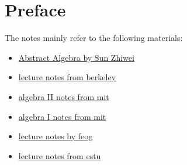 \chapter*{Preface}

The notes mainly refer to the following materials:
\begin{itemize}
    \item \href{https://www.bilibili.com/video/BV1AL4y1h7iF?p=1&vd_source=3d4b12fb4a4bfbc98942d43612ae2fb9}{Abstract Algebra by Sun Zhiwei}
    \item \href{https://math.berkeley.edu/~mcivor/math113su16/}{lecture notes from berkeley}
    \item \href{https://ocw.mit.edu/courses/res-18-012-algebra-ii-student-notes-spring-2022/pages/student-notes/}{algebra II notes from mit}
    \item \href{https://ocw.mit.edu/courses/res-18-011-algebra-i-student-notes-fall-2021/pages/student-notes/}{algebra I notes from mit}
    \item \href{https://feog.github.io/}{lecture notes by feog}
    \item \href{https://faculty.etsu.edu/gardnerr/5410/notes/III-1.pdf}{lecture notes from estu}
\end{itemize}

